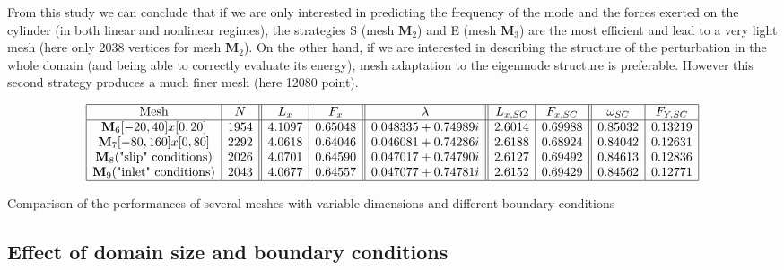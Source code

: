 \documentclass[twocolumn,10pt]{asme2ej}
\begin{document}
From this study we can conclude that if we are only interested in predicting the frequency of the mode and the forces exerted on the cylinder (in both linear and nonlinear regimes), the strategies S (mesh $\mathbf{M}_2$) and E (mesh $\mathbf{M}_3$) are the most efficient and lead to a very light mesh (here only 2038 vertices for mesh $\mathbf{M}_2$). On the other hand, if we are interested in describing the structure of the perturbation in the whole domain (and being able to correctly evaluate its energy), mesh adaptation to the eigenmode structure is preferable.
However this second strategy produces a much finer mesh (here 12080 point).
 
 
 \begin{table*}
$$
\begin{array}{|c|c||c|c||c||c|c||c|c|}
\hline
\mbox{Mesh} & N & L_x & F_x & \lambda & L_{x,SC} & F_{x,SC} & \omega_{SC}  & F_{Y,SC} \\%
\hline
\mathbf{M}_6 [-20,40]x[0,20] 			& 1954	&  4.1097 & 0.65048 	& 0.048335+0.74989i 	& 2.6014  & 0.69988 & 0.85032 & 0.13219 \\%
\mathbf{M}_7 [-80,160]x[0,80] 			& 2292	& 4.0618 & 0.64046		& 0.046081+0.74286i 	& 2.6188 	& 0.68924 	& 0.84042 & 0.12631 \\%
\mathbf{M}_8 \mbox{("slip" conditions)}	 & 2026	& 4.0701 &0.64590		& 0.047017+0.74790i	& 2.6127 	& 0.69492		& 0.84613 & 0.12836 \\%
\mathbf{M}_9 \mbox{("inlet" conditions)}	 & 2043	& 4.0677 &0.64	557	& 0.047077+0.74781i	& 2.6152 	& 0.69429		& 0.84562  & 0.12771 \\%
\hline
\end{array}
$$
\caption{Comparison of the performances of several meshes with variable dimensions and different boundary conditions}
\label{tab:conv3}
\end{table*}






\subsection{Effect of domain size and boundary conditions}
\end{document}
